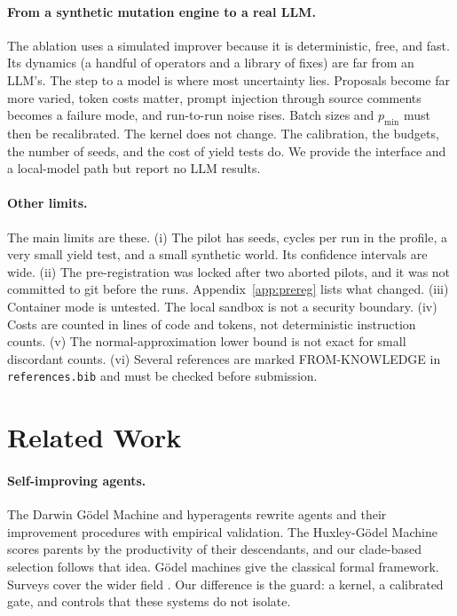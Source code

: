\documentclass[11pt]{article}
\begin{document}
\paragraph{From a synthetic mutation engine to a real LLM.} The ablation uses a simulated improver because it is deterministic, free, and fast. Its dynamics (a handful of operators and a library of fixes) are far from an LLM's.
The step to a model is where most uncertainty lies. Proposals become far more varied, token costs matter, prompt injection through source comments becomes a failure mode, and run-to-run noise rises. Batch sizes and $p_{\min}$ must then be recalibrated.
The kernel does not change. The calibration, the budgets, the number of seeds, and the cost of yield tests do. We provide the interface and a local-model path but report no LLM results.

\paragraph{Other limits.} The main limits are these.
(i) The pilot has \NSeeds{} seeds, \NCycles{} cycles per run in the \AblProfile{} profile, a very small yield test, and a small synthetic world. Its confidence intervals are wide.
(ii) The pre-registration was locked after two aborted pilots, and it was not committed to git before the runs. Appendix~\ref{app:prereg} lists what changed.
(iii) Container mode is untested. The local sandbox is not a security boundary.
(iv) Costs are counted in lines of code and tokens, not deterministic instruction counts.
(v) The normal-approximation lower bound is not exact for small discordant counts.
(vi) Several references are marked FROM-KNOWLEDGE in \texttt{references.bib} and must be checked before submission.

\section{Related Work}
\label{sec:related}

\paragraph{Self-improving agents.} The Darwin G\"odel Machine \citep{zhang2025dgm} and hyperagents \citep{zhang2026hyperagents} rewrite agents and their improvement procedures with empirical validation. The Huxley-G\"odel Machine \citep{wang2026hgm} scores parents by the productivity of their descendants, and our clade-based selection follows that idea.
G\"odel machines \citep{schmidhuber2007godel} give the classical formal framework. Surveys cover the wider field \citep{chen2026rsi}. Our difference is the guard: a kernel, a calibrated gate, and controls that these systems do not isolate.
\end{document}
